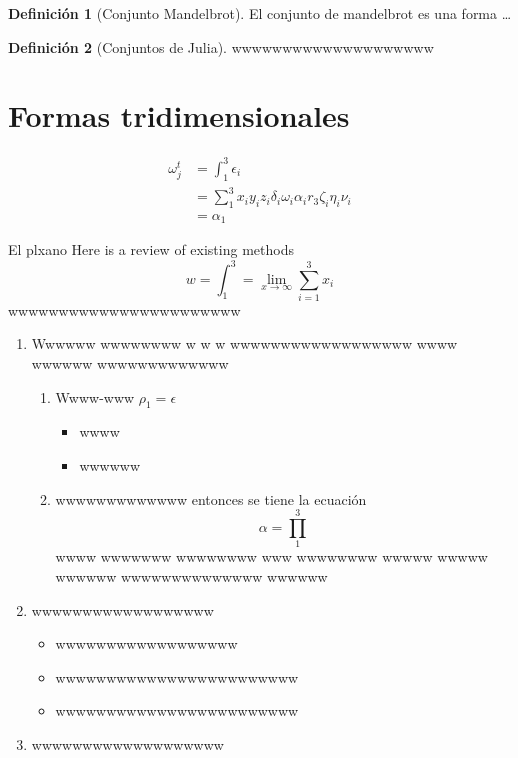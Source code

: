 \documentclass[
  16pt,
]{krantz}
\providecommand{\tightlist}{%
  \setlength{\itemsep}{0pt}\setlength{\parskip}{0pt}}
\theoremstyle{definition}
\newtheorem{definition}{Definición}[chapter]
\theoremstyle{definition}
\theoremstyle{definition}
\theoremstyle{definition}
\theoremstyle{remark}
\begin{document}
\begin{definition}[Conjunto Mandelbrot]
\protect\hypertarget{def:mmandelbrot}{}{\label{def:mmandelbrot} {} }El conjunto de mandelbrot es una forma \ldots{}
\end{definition}

\begin{definition}[Conjuntos de Julia]
\protect\hypertarget{def:julia}{}{\label{def:julia} {} }wwwwwwwwwwwwwwwwwwww
\end{definition}

\hypertarget{formas-tridimensionales}{%
\chapter{Formas tridimensionales}\label{formas-tridimensionales}}

\begin{align*}
\omega_j^t&=\int_1^3\epsilon_i\\
&=\sum_1^3x_iy_iz_i\delta_i\omega_i\alpha_ir_3\zeta_i\eta_i\nu_i\\
&=\alpha_1
\end{align*}

El plxano Here is a review of existing methods
\[
w=\int_1^3=\lim_{x\to\infty}\sum_{i=1}^3 x_i
\]
wwwwwwwwwwwwwwwwwwwwwww

\begin{enumerate}
\def\labelenumi{\arabic{enumi}.}
\tightlist
\item
  Wwwwww wwwwwwww w w w wwwwwwwwwwwwwwwwww wwww wwwwww wwwwwwwwwwwww

  \begin{enumerate}
  \def\labelenumii{\alph{enumii}.}
  \tightlist
  \item
    Wwww-www \(\rho_1=\epsilon\)

    \begin{itemize}
    \tightlist
    \item
      wwww
    \item
      wwwwww
    \end{itemize}
  \item
    wwwwwwwwwwwww entonces se tiene la ecuación \[
    \alpha=\prod_1^3
    \]wwww wwwwwww wwwwwwww www wwwwwwww wwwww wwwww wwwwww wwwwwwwwwwwwww wwwwww
  \end{enumerate}
\item
  wwwwwwwwwwwwwwwwww

  \begin{itemize}
  \tightlist
  \item
    wwwwwwwwwwwwwwwwww
  \item
    wwwwwwwwwwwwwwwwwwwwwwww
  \item
    wwwwwwwwwwwwwwwwwwwwwwww
  \end{itemize}
\item
  wwwwwwwwwwwwwwwwwww
\end{enumerate}
\end{document}
